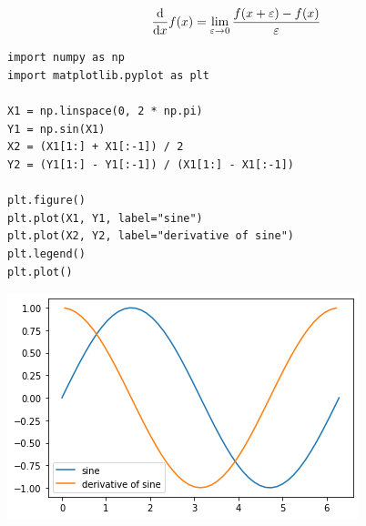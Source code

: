 
\begin{frame}[fragile]
%
\vspace{-8pt}
\begin{tcolorbox}[title=Differential Quotient]
	\begin{equation*}
	\dv{x} f(x)
=
	\lim_{\varepsilon \to 0}
		\frac
			{f(x + \varepsilon) - f(x)}
			{\varepsilon}
	\end{equation*}
\end{tcolorbox}
%
\vspace{-3pt}
\begin{codebox}[Example: Numerical Derivative, width=.6\linewidth, nobeforeafter, equal height group = grpXmpNumPyDerivative]
\begin{verbatim}
import numpy as np
import matplotlib.pyplot as plt

X1 = np.linspace(0, 2 * np.pi)
Y1 = np.sin(X1)
X2 = (X1[1:] + X1[:-1]) / 2
Y2 = (Y1[1:] - Y1[:-1]) / (X1[1:] - X1[:-1])

plt.figure()
plt.plot(X1, Y1, label="sine")
plt.plot(X2, Y2, label="derivative of sine")
plt.legend()
plt.plot()
\end{verbatim}
\end{codebox}
%
\begin{tcolorbox}[title=Example: Num. Derivative, width=.39\linewidth, nobeforeafter, equal height group = grpXmpNumPyDerivative]
\hspace{-14pt}
\includegraphics[width=1.2\linewidth]{./gfx/np-derivative}
\end{tcolorbox}
%
\end{frame}


